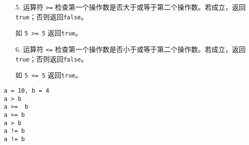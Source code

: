 \begin{frame}\ft{\subsecname}
  \begin{enumerate}
\item[5.]
  运算符 \lstinline|>=| 检查第一个操作数是否大于或等于第二个操作数。若成立，返回\lstinline|true|；否则返回\lstinline|false|。\\[.1in]
  \item[] 如 \lstinline|5 >= 5| 返回\lstinline|true|。\\[.1in]
\item[6.]
  运算符 \lstinline|<=| 检查第一个操作数是否小于或等于第二个操作数。若成立，返回\lstinline|true|；否则返回\lstinline|false|。\\[.1in]
\item[] 如 \lstinline|5 <= 5| 返回\lstinline|true|。
\end{enumerate}
  
\end{frame}

\begin{frame}\ft{\subsecname}

  
\end{frame}
 

\begin{frame}[fragile]\ft{\subsecname}
\begin{lstlisting}[backgroundcolor=\color{red!10}]
a = 10, b = 4
a > b
a >=  b
a >= b
a > b
a != b
a != b
\end{lstlisting}  
\end{frame}


